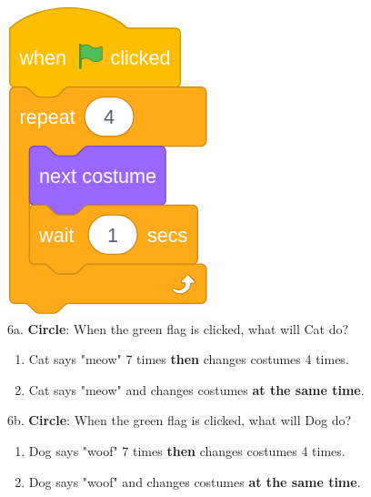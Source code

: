 \documentclass[letterpaper,12pt]{article}
\begin{document}
\includegraphics[scale=.3, valign=t]{q6_script2.png} \\ 

\noindent 6a. \textbf{Circle}: When the green flag is clicked, what will Cat do?
\renewcommand{\theenumi}{\Alph{enumi}}
\begin{enumerate}
\item Cat says "meow" 7 times \textbf{then} changes costumes 4 times.
\item Cat says "meow" and changes costumes \textbf{at the same time}. \\
\end{enumerate}

\noindent 6b. \textbf{Circle}: When the green flag is clicked, what will Dog do?
\renewcommand{\theenumi}{\Alph{enumi}}
\begin{enumerate}
\item Dog says "woof" 7 times \textbf{then} changes costumes 4 times.
\item Dog says "woof" and changes costumes \textbf{at the same time}.
\end{enumerate}

\noindent \dotfill \\
\end{document}
